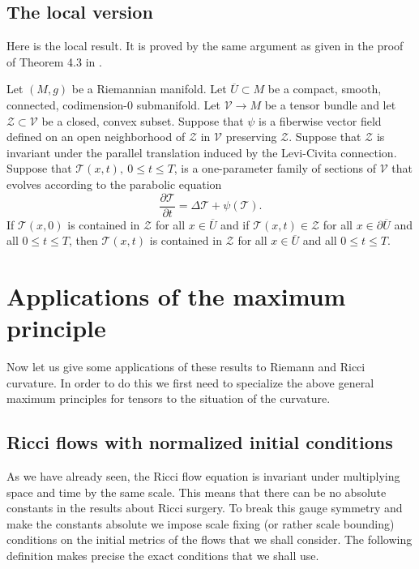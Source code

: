\subsection{The local version}

Here is the local result. It is proved by the same argument as given
in the proof of Theorem 4.3 in \cite{Hamilton4MPCO}.

\begin{theorem}
\label{thm:maximum-principle-tensors-local}
\label{localMP}
Let $(M,g)$ be a Riemannian manifold. Let $\overline U\subset M$ be a compact,
smooth, connected, codimension-$0$ submanifold. Let ${\mathcal V}\to M$ be a
tensor bundle and let ${\mathcal Z}\subset {\mathcal V}$ be a closed, convex
subset. Suppose that $\psi$ is a fiberwise vector field defined on an open
neighborhood of ${\mathcal Z}$ in ${\mathcal V}$ preserving ${\mathcal Z}$.
Suppose that ${\mathcal Z}$ is invariant under the parallel translation induced
by the Levi-Civita connection. Suppose that ${\mathcal T}(x,t),\ 0\le t\le T$,
is a one-parameter family of sections of ${\mathcal V}$ that evolves according
to the parabolic equation
$$\frac{\partial {\mathcal T}}{\partial t}=\Delta {\mathcal T}
+\psi({\mathcal T}).$$ If ${\mathcal T}(x,0)$ is contained in
${\mathcal Z}$ for all $x\in \overline U$ and if ${\mathcal
T}(x,t)\in {\mathcal Z}$ for all $x\in \partial \overline U$ and all
$0\le t\le T$, then ${\mathcal T}(x,t)$ is contained in ${\mathcal
Z}$ for all $x\in \overline U$ and all $0\le t\le T$.
\end{theorem}



\section{Applications of the maximum principle}

Now let us give some applications of these results to Riemann and
Ricci curvature. In order to do this we first need to specialize the
above general maximum principles for tensors to the situation of the
curvature.

\subsection{Ricci flows with normalized initial conditions}

As we have already seen, the Ricci flow equation is invariant under multiplying
space and time by the same scale. This means that there can be no absolute
constants in the results about Ricci surgery. To break this gauge symmetry and
make the constants absolute we impose scale fixing (or rather scale bounding)
conditions on the initial metrics of the flows that we shall consider. The
following definition makes precise the exact conditions that we shall use.













